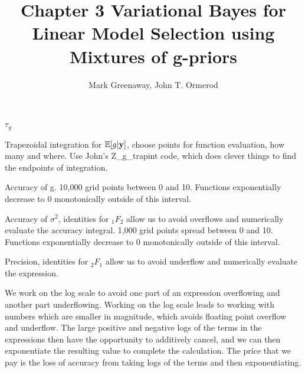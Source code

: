 \documentclass{amsart}[12pt]
\title{Chapter 3 Variational Bayes for Linear Model Selection using Mixtures of g-priors}
\author{Mark Greenaway, John T. Ormerod}
\begin{document}
\maketitle

$\tau_g$

Trapezoidal integration for $\mathbb{E}[g | {\bf y}]$, choose points for function evaluation, how many and where. Use
John's Z_g_trapint code, which does clever things to find the endpoints of integration.

Accuracy of g. 10,000 grid points between 0 and 10. Functions exponentially decrease to 0 monotonically
outside of this interval.

Accuracy of $\sigma^2$, identities for $_1 F_2$ allow us to avoid overflows and numerically evaluate the
accuracy integral. 1,000 grid points spread between 0 and 10. Functions exponentially decrease to 0
monotonically outside of this interval.

Precision, identities for $_2 F_1$ allow us to avoid underflow and numerically evaluate the expression.

We work on the log scale to avoid one part of an expression overflowing and another part underflowing. Working
on the log scale leads to working with numbers which are smaller in magnitude, which avoids floating point
overflow and underflow. The large positive and negative logs of the terms in the expressions then have the
opportunity to additively cancel, and we can then exponentiate the resulting value to complete the
calculation. The price that we pay is the loss of accuracy from taking logs of the terms and then
exponentiating.



\end{document}
